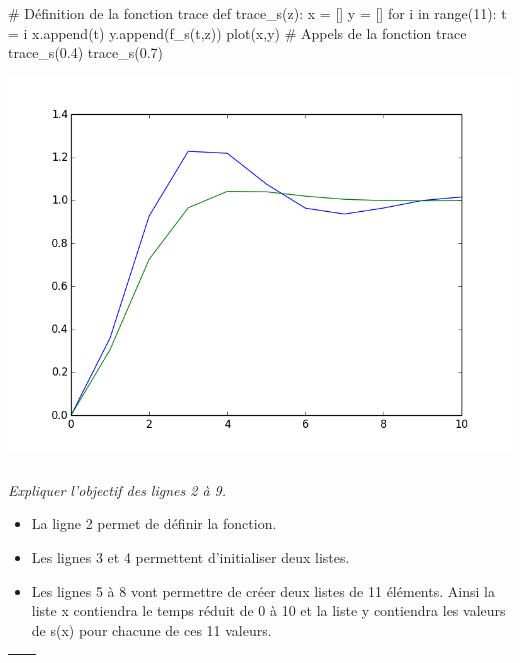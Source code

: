 \documentclass[10pt]{article}
\newif\ifprof
\begin{document}
\begin{minipage}[c]{.48\linewidth}
\begin{py}
\begin{python}
# Définition de la fonction trace
def trace_s(z):
    x = []
    y = []
    for i in range(11):
        t = i
        x.append(t)
        y.append(f_s(t,z))
    plot(x,y)
# Appels de la fonction trace
trace_s(0.4)
trace_s(0.7)

\end{python}
\end{py}
\end{minipage} \hfill
\begin{minipage}[c]{.48\linewidth}
\begin{center}
\includegraphics[width=\textwidth]{images/courbe}
\end{center}
\end{minipage}
\fi

\subparagraph{}
\textit{Expliquer l'objectif des lignes 2 à 9.}

\ifprof
\begin{corrige}
\begin{itemize}
\item La ligne 2 permet de définir la fonction.
\item Les lignes 3 et 4 permettent d'initialiser deux listes.
\item Les lignes 5 à 8 vont permettre de créer deux listes de 11 éléments. Ainsi la liste x contiendra le temps réduit de 0 à 10 et la liste y contiendra les valeurs de s(x) pour chacune de ces 11 valeurs. 
\end{itemize}
\end{corrige}
\else
\begin{tabular}{|p{}|}
\hline
$$\quad$$
\vspace{1cm}
$$\quad$$ \\
\hline
\end{tabular}
\ifprof
\else
\end{document}

